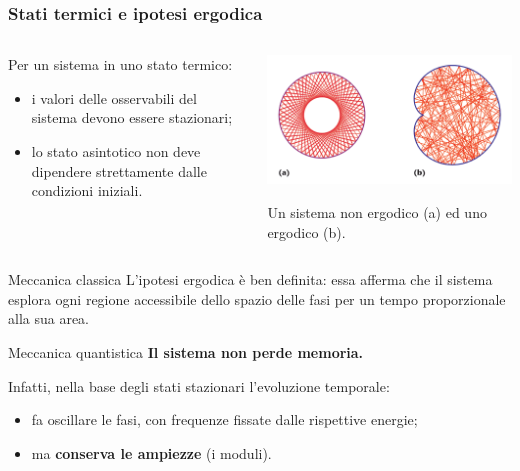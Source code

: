 \documentclass[10pt]{beamer}	%
\theoremstyle{definition}
\theoremstyle{plain}
\begin{document}
\begin{frame}
	\frametitle{Stati termici e ipotesi ergodica}
	
	\begin{columns}
		\begin{column}{0.45\textwidth}
			Per un sistema in uno stato termico:
			\begin{itemize}
				\item i valori delle osservabili del sistema devono essere stazionari;
				\item lo stato asintotico non deve dipendere strettamente dalle condizioni iniziali.
			\end{itemize}
		\end{column}
		\begin{column}{0.55\textwidth}
			\centering
			\includegraphics[width=0.9\columnwidth]{./Images/ErgodicHypothesis.png}
			
			{\footnotesize Un sistema non ergodico (a) ed uno ergodico (b).}			
		\end{column}
	\end{columns}

	\pause
	\begin{block}{Meccanica classica}
	L'ipotesi ergodica è ben definita: essa afferma che il sistema esplora ogni regione accessibile dello spazio delle fasi per un tempo proporzionale alla sua area.
	\end{block}
	\pause
	\begin{alertblock}{Meccanica quantistica}
	\textbf{Il sistema non perde memoria.}
	
	Infatti, nella base degli stati stazionari l'evoluzione temporale:
	\begin{itemize}
		\item fa oscillare le fasi, con frequenze fissate dalle rispettive energie;
		\item ma \textbf{conserva le ampiezze} (i moduli).
	\end{itemize}
	\end{alertblock}
\end{frame}
\end{document}
